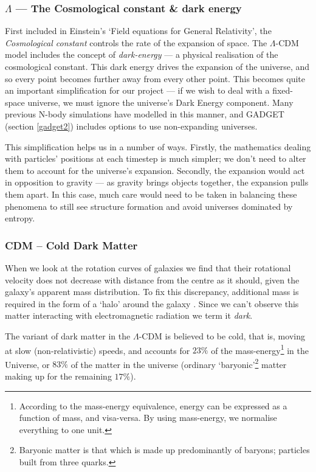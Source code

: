 \documentclass[11pt,a4paper]{article}
\begin{document}
\subsubsection{$\Lambda$ --- The Cosmological constant \& dark energy}
First included in Einstein's `Field equations for General Relativity'\cite{einsteinField}, the \emph{Cosmological constant} controls the rate of the expansion of space. The $\Lambda$-CDM model includes the concept of \emph{dark-energy} --- a physical realisation of the cosmological constant. This dark energy drives the expansion of the universe, and so every point becomes further away from every other point. This becomes quite an important simplification for our project --- if we wish to deal with a fixed-space universe, we must ignore the universe's Dark Energy component. Many previous N-body simulations have modelled in this manner, and GADGET (section \ref{gadget2}) includes options to use non-expanding universes.

This simplification helps us in a number of ways. Firstly, the mathematics dealing with particles' positions at each timestep is much simpler; we don't need to alter them to account for the universe's expansion. Secondly, the expansion would act in opposition to gravity --- as gravity brings objects together, the expansion pulls them apart. In this case, much care would need to be taken in balancing these phenomena to still see structure formation and avoid universes dominated by entropy.

\subsubsection{CDM -- Cold Dark Matter}
When we look at the rotation curves of galaxies we find that their rotational velocity does not decrease with distance from the centre as it should, given the galaxy's apparent mass distribution. To fix this discrepancy, additional mass is required in the form of a `halo' around the galaxy \cite{radial}. Since we can't observe this matter interacting with electromagnetic radiation we term it \emph{dark}.

The variant of dark matter in the $\Lambda$-CDM is believed to be cold, that is, moving at slow (non-relativistic) speeds, and accounts for $23\%$ of the mass-energy\footnote{According to the mass-energy equivalence, energy can be expressed as a function of mass, and visa-versa. By using mass-energy, we normalise everything to one unit.} in the Universe, or $83\%$ of the matter in the universe (ordinary `baryonic'\footnote{Baryonic matter is that which is made up predominantly of baryons; particles built from three quarks.} matter making up for the remaining $17\%$). 
\end{document}
